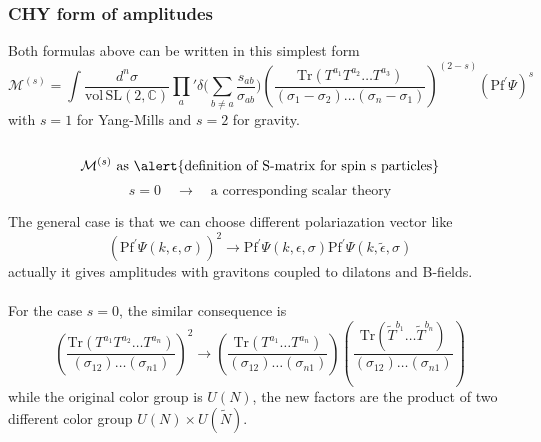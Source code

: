 \documentclass{beamer}
\begin{document}
\begin{frame}
    \frametitle{CHY form of amplitudes}
    Both formulas above can be written in this simplest form 
    \alert{
        \begin{equation*}
            \!\!\!\!\mathcal{M}^{(s)}\!=\!\!\!\int\frac{d^n\sigma}{\mathrm{vol\,SL}(2,\mathbb{C})}\prod_a{'}\delta\bigg(\sum_{b\neq a}\frac{s_{ab}}{\sigma_{ab}}\bigg)
            \!\!\!\left(\frac{\mathrm{Tr}(T^{a_1}T^{a_2}\dots T^{a_3})}{(\sigma_1-\sigma_2)\dots (\sigma_n-\sigma_1)}\right)^{(2-s)}{(\mathrm{Pf}^\prime\Psi)}^s
        \end{equation*}}
    with $s=1$ for Yang-Mills and $s=2$ for gravity.
    \\ \hspace*{\fill}\\
    \begin{equation*}
        \mathcal{M}^{(s)} \text{ as \alert{definition of S-matrix for spin s particles}}
    \end{equation*}
    \begin{equation*}
        s=0\quad\to \quad \text{a corresponding scalar theory}
    \end{equation*}
\end{frame}
\begin{frame}
    The general case is that we can choose different polariazation vector like 
    \begin{equation*}
        \left(\mathrm{Pf}^\prime \Psi(k,\epsilon,\sigma)\right)^2\to\mathrm{Pf}^\prime \Psi(k,\epsilon,\sigma)\mathrm{Pf}^\prime \Psi(k,\tilde{\epsilon},\sigma)
    \end{equation*}
    actually it gives amplitudes with gravitons coupled to dilatons and B-fields.
    \\ \hspace*{\fill}\\
    For the case $s=0$, the similar consequence is 
    \begin{equation*}
        \left(\frac{\mathrm{Tr}(T^{a_1}T^{a_2}\dots T^{a_n})}{(\sigma_{12})\dots (\sigma_{n1})}\right)^2\to\left(\frac{\mathrm{Tr}(T^{a_1}\dots T^{a_n})}{(\sigma_{12})\dots (\sigma_{n1})}\right)
        \left(\frac{\mathrm{Tr}(\tilde{T}^{b_1}\dots \tilde{T}^{b_n})}{(\sigma_{12})\dots (\sigma_{n1})}\right)
    \end{equation*}
    while the original color group is $U(N)$, the new factors are the product of two different color group \alert{$U(N)\times U(\tilde{N})$}.
\end{frame}
\end{document}
